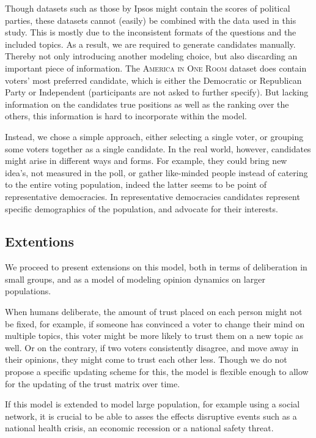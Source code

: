 Though datasets such as those by Ipsos might contain the scores of political
parties, these datasets cannot (easily) be combined with the data used in this
study. This is mostly due to the inconsistent formats of the questions and the
included topics. As a result, we are required to generate candidates manually.
Thereby not only introducing another modeling choice, but also discarding an
important piece of information. The \textsc{America in One Room} dataset does
contain voters' most preferred candidate, which is either the Democratic or
Republican Party or Independent (participants are not asked to further
specify). But lacking information on the candidates true positions as well as
the ranking over the others, this information is hard to incorporate within the
model. 

Instead, we chose a simple approach, either selecting a single
voter, or grouping some voters together as a single candidate. In the real
world, however, candidates might arise in different ways and forms. For
example, they could bring new idea's, not measured in the poll, or gather
like-minded people instead of catering to the entire voting population, indeed
the latter seems to be point of representative democracies. In representative
democracies candidates represent specific demographics of the population, and
advocate for their interests.


\subsection{Extentions}


We proceed to present extensions on this model, both in terms of deliberation
in small groups, and as a model of modeling opinion dynamics on larger
populations.

When humans deliberate, the amount of trust placed on each person might not be
fixed, for example, if someone has convinced a voter to change their mind on
multiple topics, this voter might be more likely to trust them on a new topic
as well. Or on the contrary, if two voters consistently disagree, and move away
in their opinions, they might come to trust each other less. Though we do not
propose a specific updating scheme for this, the model is flexible enough to
allow for the updating of the trust matrix over time. 

If this model is extended to model large population, for example using a social
network, it is crucial to be able to asses the effects disruptive events such
as a national health crisis, an economic recession or a national safety threat.


